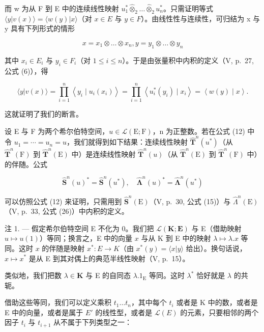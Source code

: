 而 w 为从 F 到 E 中的连续线性映射 \(u_{1}^{*}\hat{\otimes}_{2}\ldots\hat{\otimes}_{2}u_{n}^{*}\)。只需证明等式 \(\langle y|v(x)\rangle=\langle w(y)|x\rangle\)（对 \(x\in E\) 与 \(y\in F\)）。由线性性与连续性，可归结为 x 与 y 具有下列形式的情形

\[
x = x _ {1} \otimes \ldots \otimes x _ {n}, y = y _ {1} \otimes \ldots \otimes y _ {n}
\]

其中 \(x_{i} \in E_{i}\) 与 \(y_{i} \in F_{i}\)（对 \(1 \leqslant i \leqslant n\)）。于是由张量积中内积的定义（V, p.~27, 公式 (6)），得

\[
\langle y | v (x) \rangle = \prod_ {i = 1} ^ {n} \left\langle y _ {i} \mid u _ {i} \left(x _ {i}\right) \right\rangle = \prod_ {i = 1} ^ {n} \left\langle u _ {i} ^ {*} \left(y _ {i}\right) \mid x _ {i} \right\rangle = \left\langle w (y) \mid x \right\rangle .
\]

这就证明了我们的断言。

设 E 与 F 为两个希尔伯特空间，\(u \in \mathcal{L}(\mathrm{E}; \mathrm{F})\)，n 为正整数。若在公式 (12) 中令 \(u_{1} = \cdots = u_{n} = u\)，我们就得到如下结果：连续线性映射 \(\hat{\mathbf{T}}^{n}(u^{*})\)（从 \(\hat{\mathbf{T}}^{n}(\mathrm{F})\) 到 \(\hat{\mathbf{T}}^{n}(\mathrm{E})\) 中）是连续线性映射 \(\hat{\mathbf{T}}^{n}(u)\)（从 \(\hat{\mathbf{T}}^{n}(\mathrm{E})\) 到 \(\hat{\mathbf{T}}^{n}(\mathrm{F})\) 中）的伴随。公式

\[
\hat {\mathbf {S}} ^ {n} (u) ^ {*} = \hat {\mathbf {S}} ^ {n} (u ^ {*}), \quad \hat {\symbf {\Lambda}} ^ {n} (u) ^ {*} = \hat {\symbf {\Lambda}} ^ {n} (u ^ {*})\tag{13}
\]

可以仿照公式 (12) 来证明，只需用到 \(\hat{\mathbf{S}}^n (\mathrm{E})\)（V, p.~30, 公式 (15)）与 \(\hat{\Lambda}^n (\mathrm{E})\)（V, p.~33, 公式 (26)）中内积的定义。

注 1. --- 假定希尔伯特空间 E 不化为 0。我们把 \(\mathcal{L}(\mathbf{K};\mathbf{E})\) 与 E（借助映射 \(u\mapsto u(1)\)）等同；换言之，E 中的向量 \(x\) 与从 K 到 E 中的映射 \(\lambda\mapsto\lambda.x\) 等同。这时 \(x\) 的伴随是映射 \(x^{*}:E\to K\)（由 \(x^{*}(y)=\langle x|y\rangle\) 给出）。换句话说，\(x\mapsto x^{*}\) 是从 E 到其对偶上的典范半线性映射（V, p.~15）。

类似地，我们把数 \(\lambda \in \mathbf{K}\) 与 E 的自同态 \(\lambda. 1_{\mathrm{E}}\) 等同。这时 \(\lambda^{*}\) 恰好就是 \(\lambda\) 的共轭。

借助这些等同，我们可以定义乘积 \(t_{1} \ldots t_{n}\)，其中每个 \(t_{i}\) 或者是 K 中的数，或者是 E 中的向量，或者是属于 \(E'\) 的线性型，或者是 \(\mathcal{L}(E)\) 的元素，只要相邻的两个因子 \(t_{i}\) 与 \(t_{i+1}\) 从不属于下列类型之一：

